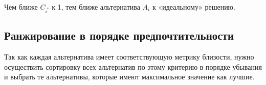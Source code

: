 \documentclass{article}
\begin{document}
        Чем ближе \(C_{i^{*}}\) к 1, тем ближе альтернатива \(A_i\) к «идеальному» решению.

    \subsection{Ранжирование в порядке предпочтительности}
        Так как каждая альтернатива имеет соответствующую метрику близости, нужно осуществить
        сортировку всех альтернатив по этому критерию в порядке убывания и выбрать те
        альтернативы, которые имеют максимальное значение как лучшие.



\end{document}
